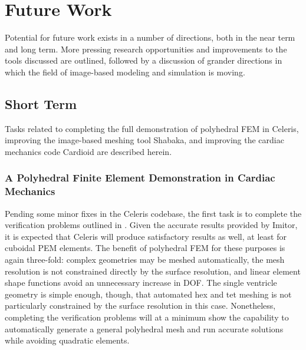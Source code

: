 \chapter{Future Work}
\label{chap:6}

Potential for future work exists in a number of directions, both in the near term and long term. More pressing research opportunities and improvements to the tools discussed are outlined, followed by a discussion of grander directions in which the field of image-based modeling and simulation is moving.

\section{Short Term}
\label{Short Term}

Tasks related to completing the full demonstration of polyhedral FEM in Celeris, improving the image-based meshing tool Shabaka, and improving the cardiac mechanics code Cardioid are described herein.

\subsection[A Polyhedral Finite Element Demonstration in Cardiac \\ Mechanics]{\texorpdfstring{A Polyhedral Finite Element Demonstration in Cardiac Mechanics}{A Polyhedral Finite Element Demonstration in Cardiac Mechanics}}
\label{A Polyhedral Finite Element Demonstration in Cardiac Mechanics}

Pending some minor fixes in the Celeris codebase, the first task is to complete the verification problems outlined in . Given the accurate results provided by Imitor, it is expected that Celeris will produce satisfactory results as well, at least for cuboidal PEM elements. The benefit of polyhedral FEM for these purposes is again three-fold: complex geometries may be meshed automatically, the mesh resolution is not constrained directly by the surface resolution, and linear element shape functions avoid an unnecessary increase in DOF. The single ventricle geometry is simple enough, though, that automated hex and tet meshing is not particularly constrained by the surface resolution in this case. Nonetheless, completing the verification problems will at a minimum show the capability to automatically generate a general polyhedral mesh and run accurate solutions while avoiding quadratic elements.

